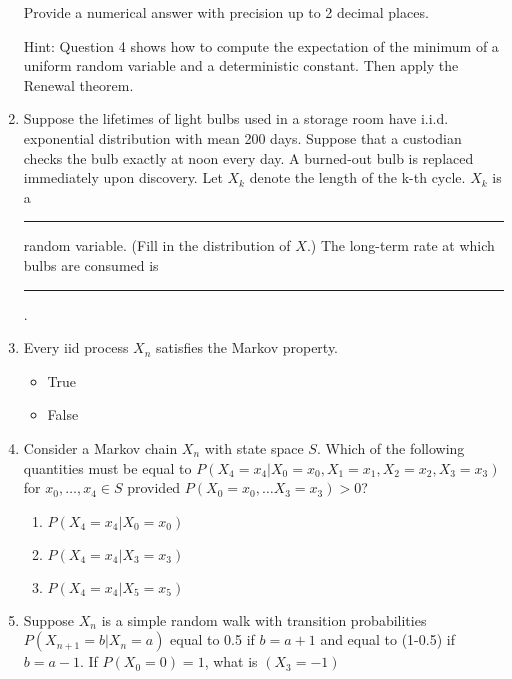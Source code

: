 \documentclass[10pt]{article}
\begin{document}
\begin{enumerate}
    Provide a numerical answer with precision up to 2 decimal places.

    Hint: Question 4 shows how to compute the expectation of the minimum of
    a uniform random variable and a deterministic constant. Then apply the
    Renewal theorem. 

\newpage

  \item Suppose the lifetimes of light bulbs used in a storage room have
    i.i.d. exponential distribution with mean 200 days. Suppose that a
    custodian checks the bulb exactly at noon every day. A burned-out bulb
    is replaced immediately upon discovery. Let $X_k$ denote the length of
    the k-th cycle. $X_k$ is a \rule{1cm}{0.15mm} random variable. (Fill
    in the distribution of $X$.) The long-term rate at which bulbs are
    consumed is \rule{1cm}{0.15mm}.

\newpage

  \item Every iid process $X_n$ satisfies the Markov property.
    \begin{itemize}
      \item True
      \item False \checkmark
    \end{itemize}

\newpage

  \item Consider a Markov chain $X_n$ with state space $S$.  Which of the
    following quantities must be equal to $P(X_4 = x_4 | X_0 = x_0, X_1 = 
    x_1, X_2 = x_2, X_3 = x_3)$ for $x_0, \dots, x_4 \in S$ provided
    $P(X_0=x_0, \dots X_3 = x_3) > 0$?
    \begin{enumerate}
      \item $P(X_4 = x_4 | X_0 = x_0)$
      \item $P(X_4 = x_4 | X_3 = x_3)$
      \item $P(X_4 = x_4 | X_5 = x_5)$
    \end{enumerate}

\newpage

  \item Suppose $X_n$ is a simple random walk with transition
    probabilities $P(X_{n+1} = b|X_n = a)$ equal to 0.5 if $b=a+1$ and
    equal to (1-0.5) if $b=a-1$.  If $P(X_0=0)=1$, what is $(X_3=-1)$
\end{enumerate}
\end{document}
